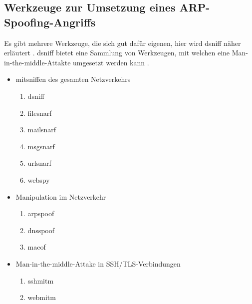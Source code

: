 \subsection{Werkzeuge zur Umsetzung eines ARP-Spoofing-Angriffs}
Es gibt mehrere Werkzeuge, die sich gut dafür eigenen, hier wird dsniff näher erläutert \cite[vgl]{dsniff}.
dsniff bietet eine Sammlung von Werkzeugen, mit welchen eine Man-in-the-middle-Attakte umgesetzt werden kann \cite[vgl.]{dsniff_beschreibung}.
\begin{itemize}
	\item mitsniffen des gesamten Netzverkehrs
	\begin{enumerate}
	\item dsniff
	\item filesnarf
	\item mailsnarf
	\item msgsnarf
	\item urlsnarf
	\item webspy
	\end{enumerate}
	\item Manipulation im Netzverkehr
	\begin{enumerate}
	\item arpspoof
	\item dnsspoof
	\item macof
	\end{enumerate}
	\item Man-in-the-middle-Attake in SSH/TLS-Verbindungen
	\begin{enumerate}
	\item sshmitm
	\item webmitm 
	\end{enumerate}
	
\end{itemize}

